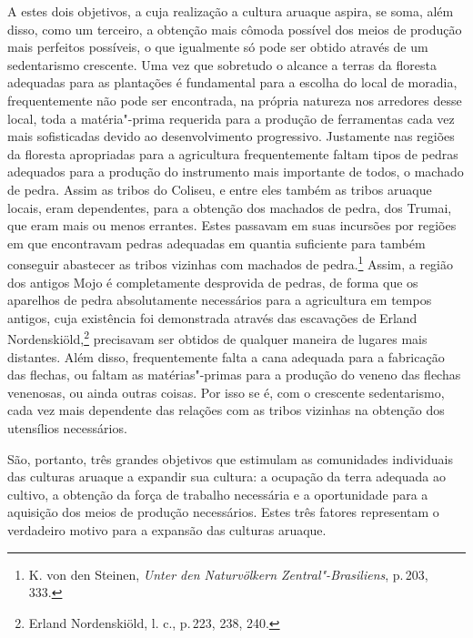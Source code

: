 A estes dois objetivos, a cuja realização a cultura aruaque aspira, se
soma, além disso, como um terceiro, a obtenção mais cômoda possível dos
meios de produção mais perfeitos possíveis, o que igualmente só pode
ser obtido através de um sedentarismo crescente. Uma vez que sobretudo
o alcance a terras da floresta adequadas para as plantações é
fundamental para a escolha do local de moradia, frequentemente não pode
ser encontrada, na própria natureza nos arredores desse local, toda a
matéria"-prima requerida para a produção de ferramentas cada vez mais
sofisticadas devido ao desenvolvimento progressivo. Justamente nas
regiões da floresta apropriadas para a agricultura frequentemente
faltam tipos de pedras adequados para a produção do instrumento mais
importante de todos, o machado de pedra. Assim as tribos do Coliseu, e
entre eles também as tribos aruaque locais, eram dependentes, para a
obtenção dos machados de pedra, dos Trumai, que eram mais ou menos
errantes. Estes passavam em suas incursões por regiões em que
encontravam pedras adequadas em quantia suficiente para também conseguir
abastecer as tribos vizinhas com machados de pedra.\footnote{K. von den
  Steinen, \textit{Unter den Naturvölkern Zentral"-Brasiliens}, p.\,203,
  333.} Assim, a região dos antigos Mojo é completamente desprovida de
pedras, de forma que os aparelhos de pedra absolutamente necessários
para a agricultura em tempos antigos, cuja existência foi demonstrada
através das escavações de Erland Nordenskiöld,\footnote{Erland
  Nordenskiöld, l. c., p.\,223, 238, 240.} precisavam ser obtidos de
qualquer maneira de lugares mais distantes. Além disso, frequentemente
falta a cana adequada para a fabricação das flechas, ou faltam as
matérias"-primas para a produção do veneno das flechas venenosas, ou
ainda outras coisas. Por isso se é, com o crescente sedentarismo, cada
vez mais dependente das relações com as tribos vizinhas na obtenção dos
utensílios necessários.

São, portanto, três grandes objetivos que estimulam as comunidades
individuais das culturas aruaque a expandir sua cultura: a ocupação da
terra adequada ao cultivo, a obtenção da força de trabalho necessária e
a oportunidade para a aquisição dos meios de produção necessários. Estes
três fatores representam o verdadeiro motivo para a expansão das
culturas aruaque.

